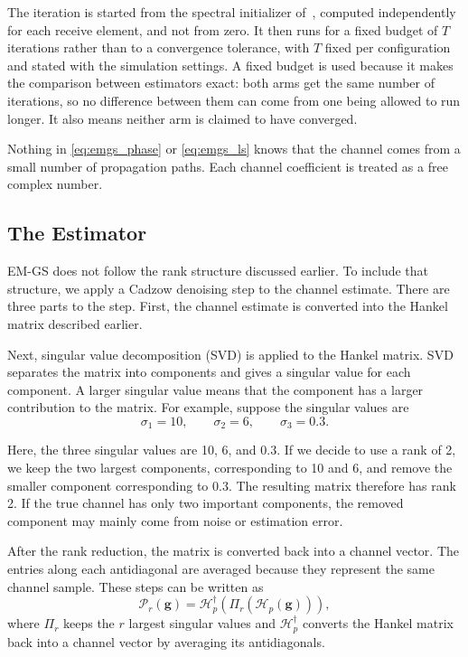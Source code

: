 \documentclass[journal]{IEEEtran}
\newcommand{\bg}{\mathbf{g}}
\newcommand{\Hank}{\mathcal{H}}
\begin{document}
The iteration is started from the spectral initializer of~\cite{cui2025},
computed independently for each receive element, and not from zero. It then
runs for a fixed budget of $T$ iterations rather than to a convergence
tolerance, with $T$ fixed per configuration and stated with the simulation
settings. A fixed
budget is used because it makes the comparison between estimators exact: both
arms get the same number of iterations, so no difference between them can come
from one being allowed to run longer. It also means neither arm is claimed to
have converged.

Nothing in \eqref{eq:emgs_phase} or \eqref{eq:emgs_ls} knows that the channel
comes from a small number of propagation paths. Each channel coefficient is
treated as a free complex number.

\subsection{The Estimator}
\label{sec:estimator}

EM-GS does not follow the rank structure discussed earlier. To include that
structure, we apply a Cadzow denoising step to the channel estimate. There are
three parts to the step. First, the channel estimate is converted into the
Hankel matrix described earlier.

Next, singular value decomposition (SVD) is applied to the Hankel matrix. SVD
separates the matrix into components and gives a singular value for each
component. A larger singular value means that the component has a larger
contribution to the matrix. For example, suppose the singular values are
\begin{equation}
\sigma_1=10,\qquad\sigma_2=6,\qquad\sigma_3=0.3.
\end{equation}

Here, the three singular values are 10, 6, and 0.3. If we decide to use a rank
of 2, we keep the two largest components, corresponding to 10 and 6, and remove
the smaller component corresponding to 0.3. The resulting matrix therefore has
rank 2. If the true channel has only two important components, the removed
component may mainly come from noise or estimation error.

After the rank reduction, the matrix is converted back into a channel vector.
The entries along each antidiagonal are averaged because they represent the
same channel sample. These steps can be written as
\begin{equation}
\mathcal{P}_r(\bg)=\Hank_p^{\dagger}\left(\Pi_r\left(\Hank_p(\bg)\right)\right),
\label{eq:cadzow}
\end{equation}
where $\Pi_r$ keeps the $r$ largest singular values and $\Hank_p^{\dagger}$
converts the Hankel matrix back into a channel vector by averaging its
antidiagonals.
\end{document}
